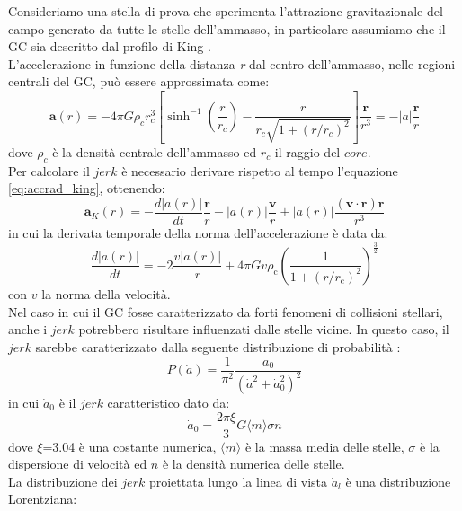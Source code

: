 Consideriamo una stella di prova che sperimenta l'attrazione gravitazionale del campo generato da tutte le stelle dell'ammasso, in particolare assumiamo che il GC sia descritto dal profilo di King \cite{king:paper}.\\
L'accelerazione in funzione della distanza \textit{r} dal centro dell'ammasso, nelle regioni centrali del GC, può essere approssimata come:
\begin{equation}
   \textbf{a}(r) = -4 \pi G \rho_{c} r_{c}^{3} \left[\sinh^{-1} \left(\frac{r}{r_{c}}\right) - \frac{r}{r_{c}\sqrt{1+({r}/{r_c})^{2}}}\right] \frac{\textbf{r}}{r^{3}} = -\left | a \right | \frac{\textbf{r}}{r}
   \label{eq:accrad_king}
\end{equation}
dove $\rho_{c}$ è la densità centrale dell'ammasso ed $r_{c}$ il raggio del $core$.\\
Per calcolare il $jerk$ è necessario derivare rispetto al tempo l'equazione \ref{eq:accrad_king}, ottenendo:
\begin{equation}
\mathbf{\Dot{a}}_{K}(r)=-\frac{d|a(r)|}{d t} \frac{\mathbf{r}}{r}-|a(r)| \frac{\mathbf{v}}{r}+|a(r)| \frac{(\mathbf{v} \cdot \mathbf{r}) \mathbf{r}}{r^{3}}
\label{eq:jerk_king}
\end{equation}
in cui la derivata temporale della norma dell'accelerazione è data da:
\begin{equation}
\frac{d|a(r)|}{d t}=-2 \frac{v|a(r)|}{r}+4 \pi G v \rho_{\mathrm{c}}\left(\frac{1}{1+\left(r / r_{\mathrm{c}}\right)^{2}}\right)^{\frac{3}{2}}
\end{equation}
con $v$ la norma della velocità.\\
Nel caso in cui il GC fosse caratterizzato da forti fenomeni di collisioni stellari, anche i $jerk$ potrebbero risultare influenzati dalle stelle vicine. In questo caso, il $jerk$ sarebbe caratterizzato dalla seguente distribuzione di probabilità \cite{prager:paper}:
\begin{equation}
P(\dot{a})=\frac{1}{\pi^{2}} \frac{\dot{a}_{0}}{\left(\dot{a}^{2}+\dot{a}_{0}^{2}\right)^{2}}
\end{equation}
in cui $\dot{a}_{0}$ è il $jerk$ caratteristico dato da:
\begin{equation}
\dot{a}_{0}=\frac{2 \pi \xi}{3} G\langle m\rangle \sigma n
\end{equation}
dove $\xi$=3.04 è una costante numerica, $\langle m \rangle$ è la massa media delle stelle, $\sigma$ è la dispersione di velocità ed $n$ è la densità numerica delle stelle.\\
La distribuzione dei $jerk$ proiettata lungo la linea di vista $\dot{a}_{l}$ è una distribuzione Lorentziana:
